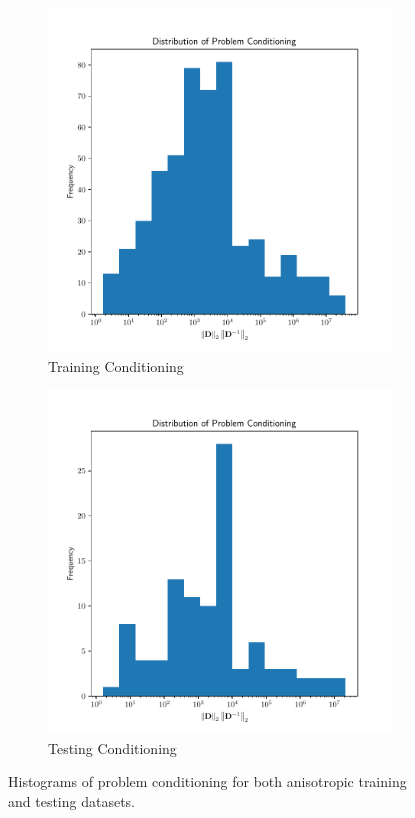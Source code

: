 \documentclass{article}
\begin{document}
\begin{figure}[h!]
  \centering
  \begin{subfigure}[t]{0.49\textwidth}
    \centering
    \includegraphics[width=\textwidth]{aniso3d_train_cond_hist.pdf}
    \caption{Training Conditioning}
  \end{subfigure}
  \begin{subfigure}[t]{0.49\textwidth}
    \centering
    \includegraphics[width=\textwidth]{aniso3d_test_cond_hist.pdf}
    \caption{Testing Conditioning}
  \end{subfigure}
  \caption{Histograms of problem conditioning for both anisotropic training and testing datasets.}
  \label{fig:cond_hist}
\end{figure}
\end{document}
